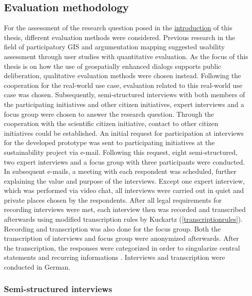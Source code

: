 \subsection{Evaluation methodology}
\label{subchap:ev_methodology}
For the assessment of the research question posed in the \hyperref[chap:introduction]{introduction} of this thesis, different evaluation methods were considered. Previous research in the field of participatory GIS and argumentation mapping suggested usability assessment through user studies with quantitative evaluation. As the focus of this thesis is on how the use of geospatially enhanced dialogs supports public deliberation, qualitative evaluation methods were chosen instead. Following the cooperation for the real-world use case, evaluation related to this real-world use case was chosen. Subsequently, semi-structured interviews with both members of the participating initiatives and other citizen initiatives, expert interviews and a focus group were chosen to answer the research question. 
Through the cooperation with the scientific citizen initiative, contact to other citizen initiatives could be established. An initial request for participation at interviews for the developed prototype was sent to participating initiatives at the sustainability project via e-mail. Following this request, eight semi-structured, two expert interviews and a focus group with three participants were conducted. In subsequent e-mails, a meeting with each respondent was scheduled, further explaining the value and purpose of the interviews. Except one expert interview, which was performed via video chat, all interviews were carried out in quiet and private places chosen by the respondents. After all legal requirements for recording interviews were met, each interview then was recorded and transcribed afterwards using modified transcription rules by Kuckartz \cite{kuckartz2007} (\ref{transcriptionrules}). Recording and transcription was also done for the focus group. Both the transcription of interviews and focus group were anonymized afterwards. After the transcription, the responses were categorized in order to singularize central statements and recurring informations \cite{naderer2007auswertung}. Interviews and transcription were conducted in German.


\subsubsection{Semi-structured interviews}

